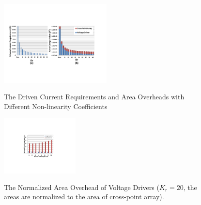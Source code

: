 %
\begin{figure}%
\centering
  \includegraphics[width=0.5\textwidth]{./figures/area_all.pdf}\\
  \vspace{-5pt}
  \caption{The Driven Current Requirements and Area Overheads with Different Non-linearity Coefficients}\label{fig:area_all}
 \vspace{-15pt}
\end{figure}


\begin{figure}%
\centering
  \includegraphics[width=0.35\textwidth]{./figures/Area_kr20.pdf}\\
  \caption{The Normalized Area Overhead of Voltage Drivers ($K_r=20$, the areas are normalized to the area of cross-point array). }\label{fig:Area_kr20}
\end{figure}
